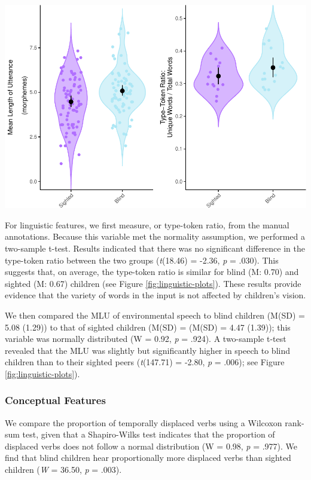 \documentclass[
  man,floatsintext]{apa6}
\begin{document}
\includegraphics{input_quality_manuscript_files/figure-latex/linguistic-plots-1.pdf}

For linguistic features, we first measure, or type-token ratio, from the manual annotations. Because this variable met the normality assumption, we performed a two-sample t-test. Results indicated that there was no significant difference in the type-token ratio between the two groups (\emph{t}(18.46) = -2.36, \emph{p} = .030). This suggests that, on average, the type-token ratio is similar for blind (M: 0.70) and sighted (M: 0.67) children (see Figure \ref{fig:linguistic-plots}). These results provide evidence that the variety of words in the input is not affected by children's vision.

We then compared the MLU of environmental speech to blind children (M(SD) = 5.08 (1.29)) to that of sighted children (M(SD) = (M(SD) = 4.47 (1.39)); this variable was normally distributed (W = 0.92, \emph{p} = .924). A two-sample t-test revealed that the MLU was slightly but significantly higher in speech to blind children than to their sighted peers (\emph{t}(147.71) = -2.80, \emph{p} = .006); see Figure \ref{fig:linguistic-plots}).

\hypertarget{conceptual-features-1}{%
\subsubsection{Conceptual Features}\label{conceptual-features-1}}

We compare the proportion of temporally displaced verbs using a Wilcoxon rank-sum test, given that a Shapiro-Wilks test indicates that the proportion of displaced verbs does not follow a normal distribution (W = 0.98, \emph{p} = .977). We find that blind children hear proportionally more displaced verbs than sighted children (\emph{W} = 36.50, \emph{p} = .003).
\end{document}
